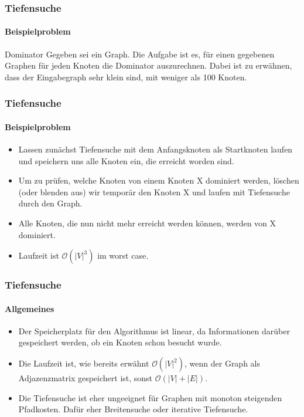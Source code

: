 \begin{frame}
	\frametitle{Tiefensuche}
	\framesubtitle{Beispielproblem}
		\begin{KITexampleblock}{Dominator}
			Gegeben sei ein Graph. Die Aufgabe ist es, für einen gegebenen Graphen für jeden Knoten die Dominator auszurechnen. Dabei ist zu erwähnen, dass der Eingabegraph sehr klein sind, mit weniger als 100 Knoten.
		\end{KITexampleblock}
\end{frame}

\begin{frame}
	\frametitle{Tiefensuche}
	\framesubtitle{Beispielproblem}
		\begin{itemize}
			\item Lassen zunächst Tiefensuche mit dem Anfangsknoten als Startknoten laufen und speichern uns alle Knoten ein, die erreicht worden sind.
			\pause
			\bigskip
			\item Um zu prüfen, welche Knoten von einem Knoten X dominiert werden, löschen (oder blenden aus) wir temporär den Knoten X und laufen mit Tiefensuche durch den Graph.
						\pause
						\bigskip
			\item Alle Knoten, die nun nicht mehr erreicht werden können, werden von X dominiert.
						\pause
						\bigskip
			\item Laufzeit ist $\mathcal{O}(|V|^3)$ im worst case.
		\end{itemize}
\end{frame}

\begin{frame}
	\frametitle{Tiefensuche}
	\framesubtitle{Allgemeines}
			\begin{itemize}
				\item Der Speicherplatz für den Algorithmus ist linear, da Informationen darüber gespeichert werden, ob ein Knoten schon besucht wurde.
				\item Die Laufzeit ist, wie bereits erwähnt $\mathcal{O}(|V|^2)$, wenn der Graph als Adjazenzmatrix gespeichert ist, sonst $\mathcal{O}(|V| + |E|)$.
				\item Die Tiefensuche ist eher ungeeignet für Graphen mit monoton steigenden Pfadkosten. Dafür eher Breitensuche oder iterative Tiefensuche.
			\end{itemize}
\end{frame}
